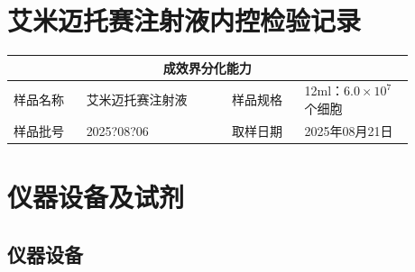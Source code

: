 \documentclass[UTF8,10pt,a4paper,fontset=fandol]{ctexart}
\newcommand{\fieldvalue}[1]{#1}
\newcommand{\handwritten}[1]{#1}
\begin{document}
\newpage

\section*{艾米迈托赛注射液内控检验记录}

\begin{center}
\begin{tabular}{|p{0.16\linewidth}|p{0.32\linewidth}|p{0.16\linewidth}|p{0.24\linewidth}|}
\hline
\multicolumn{4}{|c|}{成效界分化能力} \\ \hline
样品名称 &
\fieldvalue{艾米迈托赛注射液} &
样品规格 &
\fieldvalue{12ml：$6.0\times10^{7}$个细胞} \\ \hline
样品批号 &
\fieldvalue{\handwritten{2025?08?06}} &
取样日期 &
\fieldvalue{\handwritten{2025年08月21日}} \\ \hline
\end{tabular}
\end{center}

\section{仪器设备及试剂}

\subsection{仪器设备}
\end{document}
